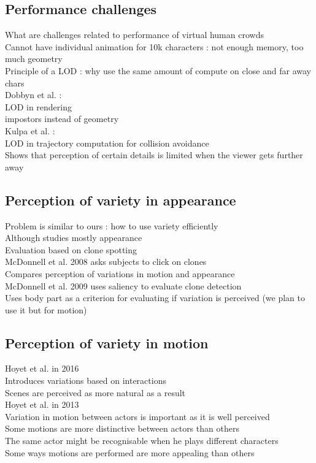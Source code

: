 \documentclass[11pt]{sdm}
\begin{document}
\subsection{Performance challenges}
What are challenges related to performance of virtual human crowds \\
Cannot have individual animation for 10k characters : not enough memory, too much geometry \\
Principle of a LOD : why use the same amount of compute on close and far away chars \\
Dobbyn et al. \cite{dobbyn2005geopostors} :\\
LOD in rendering \\
impostors instead of geometry\\
Kulpa et al.\cite{kulpa2011imperceptible} :\\
LOD in trajectory computation for collision avoidance\\
Shows that perception of certain details is limited when the viewer gets further away

\subsection{Perception of variety in appearance}
Problem is similar to ours : how to use variety efficiently\\
Although studies mostly appearance\\
Evaluation based on clone spotting\\
McDonnell et al. 2008 \cite{mcdonnell2008clone} asks subjects to click on clones\\
Compares perception of variations in motion and appearance \\
McDonnell et al. 2009 \cite{mcdonnell2009eye} uses saliency to evaluate clone detection\\
Uses body part as a criterion for evaluating if variation is perceived (we plan to use it but for motion)\\  

\subsection{Perception of variety in motion}
Hoyet et al. in 2016 \cite{hoyet2016perceptual}\\
Introduces variations based on interactions\\
Scenes are perceived as more natural as a result\\
Hoyet et al. in 2013 \cite{hoyet2013evaluating}\\
Variation in motion between actors is important as it is well perceived\\
Some motions are more distinctive between actors than others\\
The same actor might be recognisable when he plays different characters\\
Some ways motions are performed are more appealing than others\\
\end{document}
